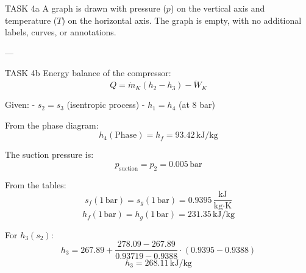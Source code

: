 TASK 4a  
A graph is drawn with pressure (\( p \)) on the vertical axis and temperature (\( T \)) on the horizontal axis. The graph is empty, with no additional labels, curves, or annotations.

---

TASK 4b  
Energy balance of the compressor:  
\[
Q = \dot{m}_K \left( h_2 - h_3 \right) - \dot{W}_K
\]

Given:  
- \( s_2 = s_3 \) (isentropic process)  
- \( h_1 = h_4 \) (at 8 bar)  

From the phase diagram:  
\[
h_4 (\text{Phase}) = h_f = 93.42 \, \text{kJ/kg}
\]

The suction pressure is:  
\[
p_{\text{suction}} = p_2 = 0.005 \, \text{bar}
\]

From the tables:  
\[
s_f (1 \, \text{bar}) = s_g (1 \, \text{bar}) = 0.9395 \, \frac{\text{kJ}}{\text{kg·K}}
\]
\[
h_f (1 \, \text{bar}) = h_g (1 \, \text{bar}) = 231.35 \, \text{kJ/kg}
\]

For \( h_3 (s_2) \):  
\[
h_3 = 267.89 + \frac{278.09 - 267.89}{0.93719 - 0.9388} \cdot (0.9395 - 0.9388)
\]
\[
h_3 = 268.11 \, \text{kJ/kg}
\]